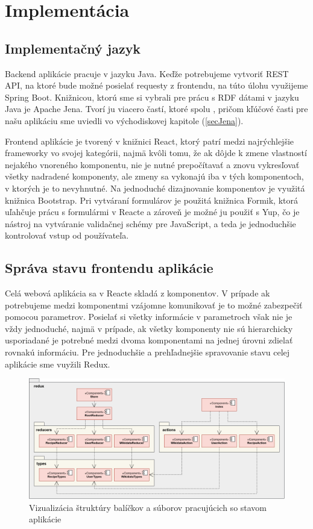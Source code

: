 \chapter{Implementácia}
\label{kap:implementacia} %

\section{Implementačný jazyk}

Backend aplikácie pracuje v jazyku Java. Keďže potrebujeme vytvoriť REST API, na ktoré bude možné posielať requesty z frontendu, na túto úlohu využijeme Spring Boot. Knižnicou, ktorú sme si vybrali pre prácu s RDF dátami v jazyku Java je Apache Jena. Tvorí ju viacero častí, ktoré spolu , pričom kľúčové časti pre našu aplikáciu sme uviedli vo východiskovej kapitole (\ref{secJena}).   

Frontend aplikácie je tvorený v knižnici React, ktorý patrí medzi najrýchlejšie frameworky vo svojej kategórii, najmä kvôli tomu, že ak dôjde k zmene vlastností nejakého vnoreného komponentu, nie je nutné prepočítavať a znovu vykresľovať všetky nadradené komponenty, ale zmeny sa vykonajú iba v tých komponentoch, v ktorých je to nevyhnutné. Na jednoduché dizajnovanie komponentov je využitá knižnica Bootstrap. Pri vytváraní formulárov je použitá knižnica Formik, ktorá uľahčuje prácu s formulármi v Reacte a zároveň je možné ju použiť s Yup, čo je nástroj na vytváranie validačnej schémy pre JavaScript, a teda je jednoduchšie kontrolovať vstup od používateľa.

\section{Správa stavu frontendu aplikácie}
Celá webová aplikácia sa v Reacte skladá z komponentov. V prípade ak potrebujeme medzi komponentmi vzájomne komunikovať je to možné zabezpečiť pomocou parametrov. Posielať si všetky informácie v parametroch však nie je vždy jednoduché, najmä v prípade, ak všetky komponenty nie sú hierarchicky usporiadané je potrebné medzi dvoma komponentami na jednej úrovni zdielať rovnakú informáciu. Pre jednoduchšie a prehľadnejšie spravovanie stavu celej aplikácie sme vuyžili Redux.  

\begin{figure}[h]
\includegraphics[width=\textwidth]{images/reactRedux}
\caption{Vizualizácia štruktúry balíčkov a súborov pracujúcich so stavom aplikácie}
\label{reactRedux}
\end{figure}

